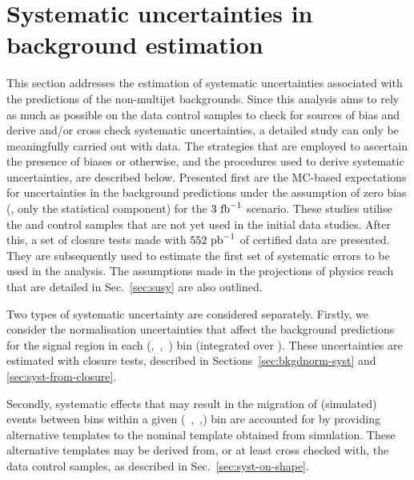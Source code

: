 \section{Systematic uncertainties in background estimation}
\label{sec:systematics}

This section addresses the estimation of systematic uncertainties
associated with the predictions of the non-multijet backgrounds. Since
this analysis aims to rely as much as possible on the data control
samples to check for sources of bias and derive and/or cross check
systematic uncertainties, a detailed study can only be meaningfully
carried out with data. The strategies that are employed to
ascertain the presence of biases or otherwise, and the procedures used
to derive systematic uncertainties, are described below. Presented
first are the MC-based
expectations for uncertainties in the background predictions under the
assumption of zero bias (\ie, only the statistical component) for the
$3~\ifb$ scenario. %
These studies utilise the
\ej and \eej control samples that are not yet used in the initial
data studies. After this, a set of closure tests made with $552~\ipb$ of certified
data are presented. They are subsequently used to estimate the first
set of systematic errors to be used in the analysis. The assumptions made in 
the projections of physics reach
that are detailed in Sec.~\ref{sec:susy} are also outlined.

Two types of systematic uncertainty are considered separately.
Firstly, we consider
the normalisation uncertainties that affect the background predictions for
the signal region in each (\nb,~\njet,~\scalht) bin (integrated over
\mht).
These uncertainties are estimated with closure tests, described in
Sections~\ref{sec:bkgdnorm-syst} and \ref{sec:syst-from-closure}.

Secondly, systematic effects that may result in the migration of
(simulated) events between \mht bins within a given (\njet~,\nb~,\scalht)
bin are accounted for by providing alternative templates to the nominal
\mht template obtained from simulation. These alternative \mht
templates may be derived from, or at least cross checked with, the
data control samples, as described in Sec.~\ref{sec:syst-on-shape}.


